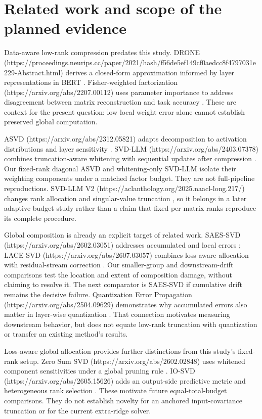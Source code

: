 \documentclass[10pt]{article}
\begin{document}
\section{Related work and scope of the planned evidence}

Data-aware low-rank compression predates this study. DRONE (https://proceedings.neurips.cc/paper/2021/hash/f56de5ef149cf0aedcc8f4797031e229-Abstract.html)
derives a closed-form approximation informed by layer representations in BERT
\cite{chen2021drone}. Fisher-weighted factorization (https://arxiv.org/abs/2207.00112)
uses parameter importance to address disagreement between matrix reconstruction
and task accuracy \cite{hsu2022weighted}. These are context for the present question:
low local weight error alone cannot establish preserved global computation.

ASVD (https://arxiv.org/abs/2312.05821) adapts decomposition to activation
distributions and layer sensitivity \cite{yuan2023asvd}.
SVD-LLM (https://arxiv.org/abs/2403.07378) combines truncation-aware whitening
with sequential updates after compression \cite{wang2024svdllm}. Our fixed-rank
diagonal ASVD and whitening-only SVD-LLM isolate their weighting components
under a matched factor budget. They are not full-pipeline reproductions.
SVD-LLM V2 (https://aclanthology.org/2025.naacl-long.217/) changes rank allocation
and singular-value truncation \cite{wang2025svdllmv2}, so it belongs in a later
adaptive-budget study rather than a claim that fixed per-matrix ranks reproduce
its complete procedure.

Global composition is already an explicit target of related work.
SAES-SVD (https://arxiv.org/abs/2602.03051) addresses accumulated and local
errors \cite{hu2026saessvd}; LACE-SVD (https://arxiv.org/abs/2607.03057) combines
loss-aware allocation with residual-stream correction \cite{liu2026lacesvd}.
Our smaller-group and downstream-drift comparisons test the location and extent
of composition damage, without claiming to resolve it. The next comparator is
SAES-SVD if cumulative drift remains the decisive failure.
Quantization Error Propagation (https://arxiv.org/abs/2504.09629) demonstrates
why accumulated errors also matter in layer-wise quantization \cite{arai2025qep}.
That connection motivates measuring downstream behavior, but does not equate
low-rank truncation with quantization or transfer an existing method's results.

Loss-aware global allocation provides further distinctions from this study's
fixed-rank setup. Zero Sum SVD (https://arxiv.org/abs/2602.02848) uses whitened
component sensitivities under a global pruning rule \cite{abbasi2026zerosum}.
IO-SVD (https://arxiv.org/abs/2605.15626) adds an output-side predictive metric
and heterogeneous rank selection \cite{abbasi2026iosvd}. These motivate future
equal-total-budget comparisons. They do not establish novelty for an anchored
input-covariance truncation or for the current extra-ridge solver.
\end{document}
